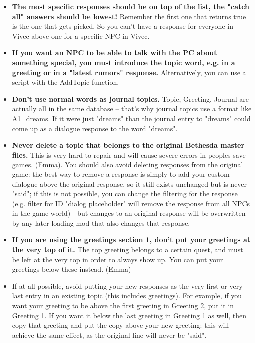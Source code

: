 \documentclass[
]{article}
\begin{document}
\begin{itemize}
\item
  \textbf{The most specific responses should be on top of the list, the
  "catch all" answers should be lowest!} Remember the first one that
  returns true is the one that gets picked. So you can't have a response
  for everyone in Vivec above one for a specific NPC in Vivec.
\item
  \textbf{If you want an NPC to be able to talk with the PC about
  something special, you must introduce the topic word, e.g. in a
  greeting or in a "latest rumors" response.} Alternatively, you can use
  a script with the AddTopic function.
\item
  \textbf{Don't use normal words as journal topics.} Topic, Greeting,
  Journal are actually all in the same database -- that's why journal
  topics use a format like A1\_dreams. If it were just "dreams" than the
  journal entry to "dreams" could come up as a dialogue response to the
  word "dreams".
\item
  \textbf{Never delete a topic that belongs to the original Bethesda
  master files.} This is very hard to repair and will cause severe
  errors in peoples save games. (Emma). You should also avoid deleting
  responses from the original game: the best way to remove a response is
  simply to add your custom dialogue above the original response, so it
  still exists unchanged but is never "said"; if this is not possible,
  you can change the filtering for the response (e.g. filter for ID
  "dialog placeholder" will remove the response from all NPCs in the
  game world) - but changes to an original response will be overwritten
  by any later-loading mod that also changes that response.
\item
  \textbf{If you are using the greetings section 1, don't put your
  greetings at the very top of it.} The top greeting belongs to a
  certain quest, and must be left at the very top in order to always
  show up. You can put your greetings below these instead. (Emma)
\item
  If at all possible, avoid putting your new responses as the very first
  or very last entry in an existing topic (this includes greetings). For
  example, if you want your greeting to be above the first greeting in
  Greeting 2, put it in Greeting 1. If you want it below the last
  greeting in Greeting 1 as well, then copy that greeting and put the
  copy above your new greeting: this will achieve the same effect, as
  the original line will never be "said".
\end{itemize}
\end{document}
